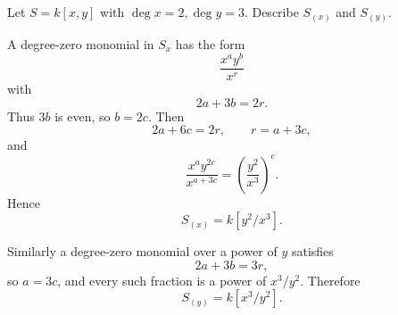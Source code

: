 \begin{problem}\label{prob:vi34-09}
Let \(S=k[x,y]\) with \(\deg x=2,\deg y=3\). Describe \(S_{(x)}\) and \(S_{(y)}\).
\end{problem}

\ifdefined\FullProblemDossiers
\begin{solution}
A degree-zero monomial in \(S_x\) has the form
\[
\frac{x^ay^b}{x^r}
\]
with
\[
2a+3b=2r.
\]
Thus \(3b\) is even, so \(b=2c\). Then
\[
2a+6c=2r,\qquad r=a+3c,
\]
and
\[
\frac{x^ay^{2c}}{x^{a+3c}}
=
\left(\frac{y^2}{x^3}\right)^c.
\]
Hence
\[
\boxed{S_{(x)}=k[y^2/x^3]}.
\]

Similarly a degree-zero monomial over a power of \(y\) satisfies
\[
2a+3b=3r,
\]
so \(a=3c\), and every such fraction is a power of \(x^3/y^2\). Therefore
\[
\boxed{S_{(y)}=k[x^3/y^2]}.
\]
\end{solution}
\fi
